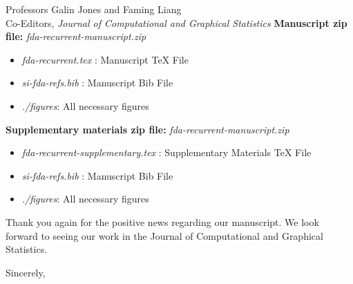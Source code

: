 \documentclass[11pt]{letter} %
\begin{document}
\begin{letter}{Professors Galin Jones and Faming Liang \\
    Co-Editors, {\em Journal of Computational and Graphical Statistics}
         }
{\bf Manuscript zip file:} \emph{fda-recurrent-manuscript.zip}
\begin{itemize}
    \item \emph{fda-recurrent.tex} : Manuscript TeX File
    \item \emph{si-fda-refs.bib} : Manuscript Bib File
    \item \emph{./figures}: All necessary figures
\end{itemize}
{\bf Supplementary materials zip file:} \emph{fda-recurrent-manuscript.zip}
\begin{itemize}
    \item \emph{fda-recurrent-supplementary.tex} : Supplementary Materials TeX File
    \item \emph{si-fda-refs.bib} : Manuscript Bib File
    \item \emph{./figures}: All necessary figures
\end{itemize}

Thank you again for the positive news regarding our manuscript.  We look forward to seeing our work in the Journal of Computational and Graphical Statistics.

\closing{Sincerely,}


\end{letter}
\end{document}
